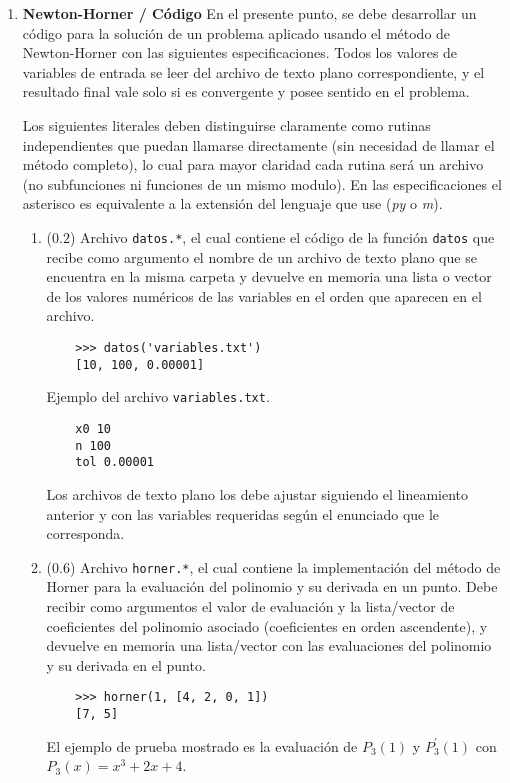 \documentclass[12pt]{article}
\begin{document}
\begin{enumerate}[leftmargin=*,widest=9]
   \vspace{5cm}

   \item \textbf{Newton-Horner / Código}
   En el presente punto, se debe desarrollar un código para la solución de un problema aplicado usando el método de Newton-Horner con las siguientes especificaciones. Todos los valores de variables de entrada se leer del archivo de texto plano correspondiente, y el resultado final vale solo si es convergente y posee sentido en el problema.

Los siguientes literales deben distinguirse claramente como rutinas independientes que puedan llamarse directamente (sin necesidad de llamar el método completo), lo cual para mayor claridad cada rutina será un archivo (no subfunciones ni funciones de un mismo modulo). En las especificaciones el asterisco es equivalente a la extensión del lenguaje que use (\textit{py} o \textit{m}).

    \begin{enumerate}[label=\alph*]
    \item (\(0.2\)) Archivo \verb-datos.*-, el cual contiene el código de la función \verb-datos- que recibe como argumento el nombre de un archivo de texto plano que se encuentra en la misma carpeta y devuelve en memoria una lista o vector de los valores numéricos de las variables en el orden que aparecen en el archivo.
    \begin{verbatim}
    >>> datos('variables.txt')
    [10, 100, 0.00001]
    \end{verbatim}

    Ejemplo del archivo \verb-variables.txt-.
    \begin{verbatim}
    x0 10
    n 100
    tol 0.00001
    \end{verbatim}
Los archivos de texto plano los debe ajustar siguiendo el lineamiento anterior y con las variables requeridas según el enunciado que le corresponda.

    \item (\(0.6\)) Archivo \verb-horner.*-, el cual contiene la implementación del método de Horner para la evaluación del polinomio y su derivada en un punto. Debe recibir como argumentos el valor de evaluación y la lista/vector de coeficientes del polinomio asociado (coeficientes en orden ascendente), y devuelve en memoria una lista/vector con las evaluaciones del polinomio y su derivada en el punto.
    \begin{verbatim}
    >>> horner(1, [4, 2, 0, 1])
    [7, 5]
    \end{verbatim}
El ejemplo de prueba mostrado es la evaluación de \(P_3(1)\) y \(P_3^\prime (1)\) con \(P_3(x) = x^3 + 2x +4\).


\end{enumerate}
\end{enumerate}
\end{document}
